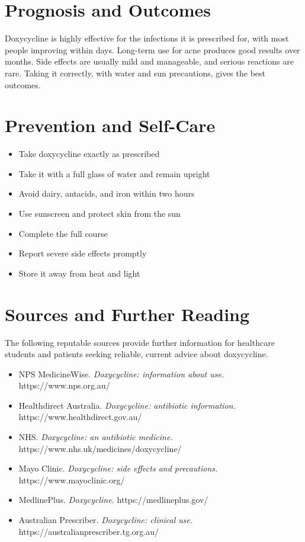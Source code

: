 \section*{Prognosis and Outcomes}
Doxycycline is highly effective for the infections it is prescribed for, with most people improving within days. Long-term use for acne produces good results over months. Side effects are usually mild and manageable, and serious reactions are rare. Taking it correctly, with water and sun precautions, gives the best outcomes.

\section*{Prevention and Self-Care}
\begin{itemize}
    \item Take doxycycline exactly as prescribed
    \item Take it with a full glass of water and remain upright
    \item Avoid dairy, antacids, and iron within two hours
    \item Use sunscreen and protect skin from the sun
    \item Complete the full course
    \item Report severe side effects promptly
    \item Store it away from heat and light
\end{itemize}

\section*{Sources and Further Reading}
The following reputable sources provide further information for healthcare students and patients seeking reliable, current advice about doxycycline.

\begin{itemize}
    \item NPS MedicineWise. \textit{Doxycycline: information about use.} https://www.nps.org.au/
    \item Healthdirect Australia. \textit{Doxycycline: antibiotic information.} https://www.healthdirect.gov.au/
    \item NHS. \textit{Doxycycline: an antibiotic medicine.} https://www.nhs.uk/medicines/doxycycline/
    \item Mayo Clinic. \textit{Doxycycline: side effects and precautions.} https://www.mayoclinic.org/
    \item MedlinePlus. \textit{Doxycycline.} https://medlineplus.gov/
    \item Australian Prescriber. \textit{Doxycycline: clinical use.} https://australianprescriber.tg.org.au/
\end{itemize}

